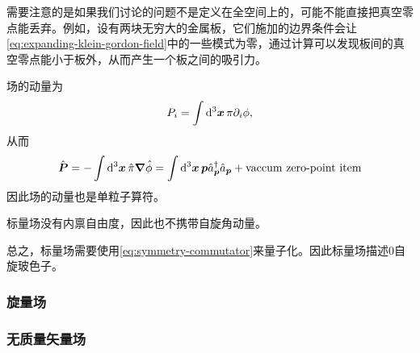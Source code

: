 \documentclass[hyperref, UTF8, a4paper]{ctexart}
\begin{document}
需要注意的是如果我们讨论的问题不是定义在全空间上的，可能不能直接把真空零点能丢弃。例如，设有两块无穷大的金属板，它们施加的边界条件会让\eqref{eq:expanding-klein-gordon-field}中的一些模式为零，通过计算可以发现板间的真空零点能小于板外，从而产生一个板之间的吸引力。

场的动量为
\[
    P_i = \int \dd[3]{\vb*{x}} \pi \partial_i \phi,
\]
从而
\begin{equation}
    \hat{\vb*{P}} = - \int \dd[3]{\vb*{x}} \hat{\pi} \grad{\hat{\phi}} = \int \dd[3]{\vb*{x}} \vb*{p} \hat{a}^\dagger_{\vb*{p}} \hat{a}_{\vb*{p}} + \text{vaccum zero-point item}
\end{equation}
因此场的动量也是单粒子算符。

标量场没有内禀自由度，因此也不携带自旋角动量。

总之，标量场需要使用\eqref{eq:symmetry-commutator}来量子化。因此标量场描述$0$自旋玻色子。

\subsubsection{旋量场}


\subsubsection{无质量矢量场}
\end{document}
